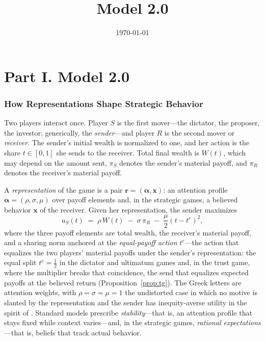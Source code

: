\documentclass[11pt]{article}
\title{Model 2.0}
\author{}
\date{\today}
\theoremstyle{plain}
\theoremstyle{remark}
\begin{document}
\maketitle

\part*{Part I. Model 2.0}

\section{How Representations Shape Strategic Behavior}
\label{sec:behavior}

Two players interact once. Player $S$ is the first mover---the dictator, the proposer, the investor; generically, the \emph{sender}---and player $R$ is the second mover or \emph{receiver}. The sender's initial wealth is normalized to one, and her action is the share $t\in[0,1]$ she sends to the receiver. Total final wealth is $W(t)$, which may depend on the amount sent, $\pi_S$ denotes the sender's material payoff, and $\pi_R$ denotes the receiver's material payoff.

A \emph{representation} of the game is a pair $\mathbf{r}=(\boldsymbol{\alpha},\mathbf{x})$: an attention profile $\boldsymbol{\alpha}=(\rho,\sigma,\mu)$ over payoff elements and, in the strategic games, a believed behavior $\mathbf{x}$ of the receiver. Given her representation, the sender maximizes
\begin{equation}
u_S (t) \;=\; \rho\, W(t)\;-\;\sigma\, \pi_R\;-\;\frac{\mu}{2}\left(t-t^{e}\right)^{2},
\label{eq:utility}
\end{equation}
where the three payoff elements are total wealth, the receiver's material payoff, and a sharing norm anchored at the \emph{equal-payoff action} $t^{e}$---the action that equalizes the two players' material payoffs under the sender's representation: the equal split $t^{e}=\tfrac12$ in the dictator and ultimatum games and, in the trust game, where the multiplier breaks that coincidence, the send that equalizes expected payoffs at the believed return (Proposition~\ref{prop:tg}). The Greek letters are attention weights, with $\rho=\sigma=\mu=1$ the undistorted case in which no motive is slanted by the representation and the sender has inequity-averse utility in the spirit of \citet{BoltonOckenfels2000}. Standard models prescribe \emph{stability}---that is, an attention profile that stays fixed while context varies---and, in the strategic games, \emph{rational expectations}---that is, beliefs that track actual behavior. 
\end{document}
